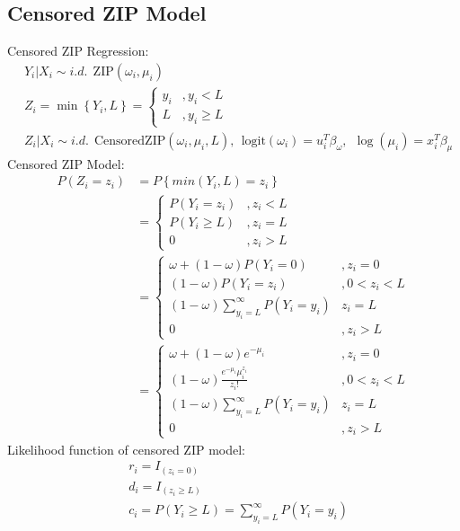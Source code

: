 \documentclass[11pt]{article}
\numberwithin{equation}{section}
\begin{document}
\subsection{Censored ZIP Model} \label{sec1-4}
Censored ZIP Regression:
\begin{align}
            &Y_i| X_i \sim i.d. \:\: \mbox{ZIP}(\omega_i,\mu_i) \nonumber\\
            &Z_i = \min\left\{Y_i,L\right\}=\left\{
                    \begin{array}{cc}
                        y_i &,y_i < L  \nonumber\\
                        L&,y_i \ge L
                    \end{array}   \right.  \nonumber\\
             &Z_i | X_i \sim i.d. \:\: \mbox{CensoredZIP}(\omega_i,\mu_i,L), \:\: \mbox{logit}(\omega_i)=u_i^T\beta_{\omega}
                     ,\:\: \log(\mu_i)=x_i^T\beta_{\mu}  
\end{align}
Censored ZIP Model:
\begin{align}
            P(Z_i=z_i) &= P \left\{ min(Y_i,L)=z_i \right\}\nonumber\\
            &=\left\{
                    \begin{array}{ccc}
                        P(Y_i = z_i)&,  z_i<L \nonumber\\
                        P(Y_i \ge L)&, z_i = L \nonumber\\
                        0&, z_i>L
                    \end{array}    \right.  \nonumber\\
            &=\left\{
                    \begin{array}{ccc}
                            \omega+(1-\omega)P(Y_i = 0) &,  z_i = 0 \\
                            (1-\omega)P(Y_i = z_i) &, 0< z_i<L \\
                         (1-\omega)\sum_{y_i=L}^{\infty}{P(Y_i=y_i)} & z_i = L\\
                        0 &,z_i>L
                    \end{array}
                 \right. \nonumber\\
            &=\left\{
                    \begin{array}{ccc}
                            \omega+(1-\omega)e^{-\mu_i} &,  z_i = 0 \\
                            (1-\omega)\frac{e^{-\mu_i}\mu_i^{z_i}}{z_i!} &, 0< z_i<L \\
                         (1-\omega)\sum_{y_i=L}^{\infty}{P(Y_i=y_i)} & z_i = L \\
                        0 &,z_i>L
                    \end{array}
                 \right.
\end{align}
Likelihood function of censored ZIP model:
\begin{align}
            &r_i = I_{(z_i=0)} \nonumber\\
            &d_i = I_{(z_i\ge L)} \nonumber\\
            &c_i = P(Y_i\ge L)= \sum_{y_i=L}^{\infty}{P(Y_i=y_i)} \nonumber
\end{align}
\end{document}
